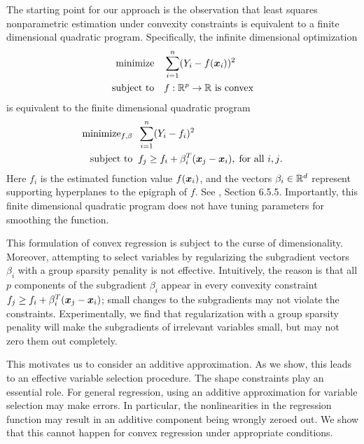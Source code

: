 The starting point for our approach is the observation that least squares
nonparametric estimation under convexity constraints is equivalent to
a finite dimensional quadratic program.  Specifically, the infinite
dimensional optimization 
\begin{align}
\begin{split}
\text{minimize} & \quad \sum_{i=1}^n (Y_i - f(\mbox{\boldmath $x$}_i))^2 \\
\text{subject to} &  \quad f:{\mathbb R}^p\rightarrow{\mathbb R}\ \text{is
  convex}
\end{split}
\end{align}
is equivalent to the finite dimensional quadratic
program 
\begin{align}
\label{eq:convreg}
\begin{split}
\text{minimize}_{f, \beta} & \;\; \sum_{i=1}^n (Y_i - f_i)^2 \\
\text{subject to} & \;\; f_j \geq f_i + \beta_i^T (\mbox{\boldmath $x$}_j-\mbox{\boldmath $x$}_i),\; \text{for
    all $i,j$}.
\end{split}
\end{align}
Here $f_i$ is the estimated function value $f(\mbox{\boldmath $x$}_i)$, and the vectors
$\beta_i \in {\mathbb R}^d$ represent supporting hyperplanes to the
epigraph of $f$.  See \cite{Boyd04}, Section 6.5.5.
Importantly, this finite dimensional quadratic program does
not have tuning parameters for smoothing the function. 

This formulation of convex regression is subject to the curse
of dimensionality.  Moreover, attempting to select variables
by regularizing the subgradient vectors $\beta_i$ with
a group sparsity penality is not effective.  Intuitively, the reason
is that all $p$ components of the subgradient $\beta_i$
appear in every convexity constraint 
$ f_j \geq f_i + \beta_i^T (\mbox{\boldmath $x$}_j-\mbox{\boldmath $x$}_i)$; small changes to the 
subgradients may not violate the constraints.  Experimentally,
we find that regularization with a group sparsity penality
will make the subgradients of irrelevant variables 
small, but may not zero them out completely.

This motivates us to consider an additive approximation. 
As we show, this leads to
an effective variable selection procedure.  The
shape constraints play an essential role.
For general regression, using an additive approximation for variable
selection may make errors.  In particular, the nonlinearities in the
regression function may result in an additive component being wrongly
zeroed out.  We show that this cannot happen for convex regression
under appropriate conditions.

